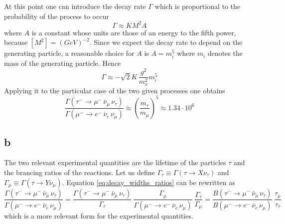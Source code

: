 At this point one can introduce the decay rate $\Gamma$ which is proportional to the probability of the process to occur
\begin{equation*}
    \Gamma \approx K M^2 A
\end{equation*}
where $A$ is a constant whose units are those of an energy to the fifth power, because $[M^2] = (GeV)^{-2}$. Since we expect the decay rate 
to depend on the generating particle, a reasonable choice for $A$ is $A=m_i^5$ where $m_i$ denotes the mass of the generating particle. Hence
\begin{equation*}
    \Gamma \approx - \sqrt{2} K \, \frac{g^2}{m_x^2}m_i^5
\end{equation*}
Applying it to the particular case of the two given processes one obtains
\begin{equation}
    \frac{\Gamma\left(\tau^- \rightarrow \mu^- \, \bar\nu_{\mu} \, \nu_{\tau}\right)}{\Gamma\left( \mu^- \rightarrow e^- \, \bar\nu_e \, \nu_{\mu}\right)}
    \approx \left(\frac{m_{\tau}}{m_{\mu}}\right)^5 \approx 1.34 \cdot 10^6
    \label{eq:decay_widths_ratios}
\end{equation}

\subsection*{b}
The two relevant experimental quantities are the lifetime of the particles $\tau$ and the brancing ratios of the reactions. Let us define
$\Gamma_{\tau} \equiv \Gamma(\tau \to X \nu_{\tau})$ and $\Gamma_{\mu} \equiv \Gamma(\tau \to Y \nu_{\mu})$. Equation \ref{eq:decay_widths_ratios} 
can be rewritten as 
\begin{equation*}
    \frac{\Gamma\left(\tau^- \rightarrow \mu^- \, \bar\nu_{\mu} \, \nu_{\tau}\right)}{\Gamma\left( \mu^- \rightarrow e^- \, \bar\nu_e \, \nu_{\mu}\right)} =
    \frac{\Gamma\left(\tau^- \rightarrow \mu^- \, \bar\nu_{\mu} \, \nu_{\tau}\right)}{\Gamma_{\tau}} \
    \frac{\Gamma_\mu}{\Gamma\left( \mu^- \rightarrow e^- \, \bar\nu_e \, \nu_{\mu}\right)} \
    \frac{\Gamma_{\tau}}{\Gamma_{\mu}} = 
    \frac{B\left(\tau^- \rightarrow \mu^- \, \bar\nu_{\mu} \, \nu_{\tau}\right)}{B\left( \mu^- \rightarrow e^- \, \bar\nu_e \, \nu_{\mu}\right)} \ 
    \frac{\tau_{\mu}}{\tau_{\tau}}
\end{equation*}
which is a more relevant form for the experimental quantities.